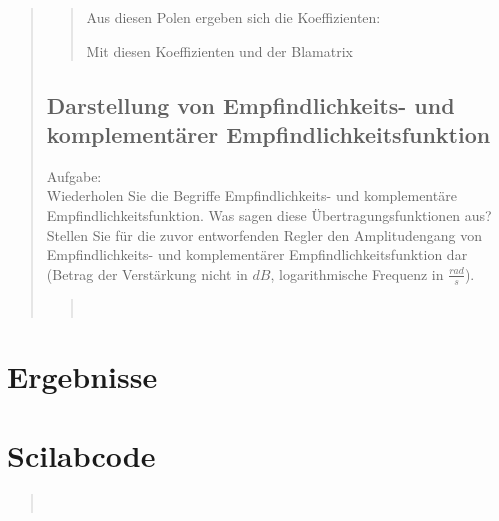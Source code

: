 \begin{quote}
\begin{quote}
        
        Aus diesen Polen ergeben sich die Koeffizienten:
        
        
        Mit diesen Koeffizienten und der Blamatrix
        
        
    \end{quote}  %
        
    \subsection{Darstellung von Empfindlichkeits- und komplementärer Empfindlichkeitsfunktion}
    Aufgabe:\\
    Wiederholen Sie die Begriffe Empfindlichkeits- und komplementäre Empfindlichkeitsfunktion. Was sagen diese
    Übertragungsfunktionen aus? Stellen Sie für die zuvor entworfenden Regler den Amplitudengang von Empfindlichkeits-
    und komplementärer Empfindlichkeitsfunktion dar (Betrag der Verstärkung nicht in $dB$, logarithmische Frequenz in
    $\frac{rad}{s}$).
    \begin{quote}
         \\
    \end{quote}  %
    
\end{quote} %


\section{Ergebnisse}
\begin{quote}
 
\end{quote} %


\section{Scilabcode}
\begin{quote}
	 \\
%     
%         

	
\end{quote} %

